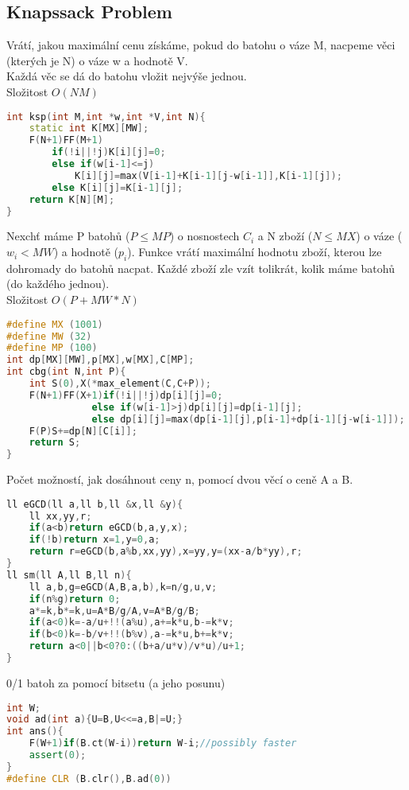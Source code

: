 \documentclass[11pt]{article}
\begin{document}
\subsection{Knapssack Problem}
Vrátí, jakou maximální cenu získáme, pokud do batohu o váze \textsf{M}, nacpeme věci (kterých je \textsf{N}) o váze \textsf{w} a hodnotě \textsf{V}.
\\Každá věc se dá do batohu vložit nejvýše jednou.
\\Složitost $O(NM)$
\begin{lstlisting}[language=C++]
int ksp(int M,int *w,int *V,int N){
    static int K[MX][MW];
    F(N+1)FF(M+1)
        if(!i||!j)K[i][j]=0;
        else if(w[i-1]<=j)
            K[i][j]=max(V[i-1]+K[i-1][j-w[i-1]],K[i-1][j]);
        else K[i][j]=K[i-1][j];
    return K[N][M];
}
\end{lstlisting}
Nexchť máme \textsf{P} batohů ($P\leq MP$) o nosnostech $C_i$ a \textsf{N} zboží ($N\leq MX$) o váze ($w_i<MW$) a hodnotě ($p_i$). Funkce vrátí maximální hodnotu zboží, kterou lze dohromady do batohů nacpat. Každé zboží zle vzít tolikrát, kolik máme batohů (do každého jednou).
\\Složitost $O(P+MW*N)$
\begin{lstlisting}[language=C++]
#define MX (1001)
#define MW (32)
#define MP (100)
int dp[MX][MW],p[MX],w[MX],C[MP];
int cbg(int N,int P){
    int S(0),X(*max_element(C,C+P));
    F(N+1)FF(X+1)if(!i||!j)dp[i][j]=0;
               else if(w[i-1]>j)dp[i][j]=dp[i-1][j];
               else dp[i][j]=max(dp[i-1][j],p[i-1]+dp[i-1][j-w[i-1]]);
    F(P)S+=dp[N][C[i]];
    return S;
}
\end{lstlisting}
Počet možností, jak dosáhnout ceny \textsf{n}, pomocí dvou věcí o ceně \textsf{A} a \textsf{B}.
\begin{lstlisting}[language=C++]
ll eGCD(ll a,ll b,ll &x,ll &y){
    ll xx,yy,r;
    if(a<b)return eGCD(b,a,y,x);
    if(!b)return x=1,y=0,a;
    return r=eGCD(b,a%b,xx,yy),x=yy,y=(xx-a/b*yy),r;
}
ll sm(ll A,ll B,ll n){
    ll a,b,g=eGCD(A,B,a,b),k=n/g,u,v;
    if(n%g)return 0;
    a*=k,b*=k,u=A*B/g/A,v=A*B/g/B;
    if(a<0)k=-a/u+!!(a%u),a+=k*u,b-=k*v;
    if(b<0)k=-b/v+!!(b%v),a-=k*u,b+=k*v;
    return a<0||b<0?0:((b+a/u*v)/v*u)/u+1;
}
\end{lstlisting}
0/1 batoh za pomocí bitsetu (a jeho posunu)
\begin{lstlisting}[language=C++]
int W;
void ad(int a){U=B,U<<=a,B|=U;}
int ans(){
    F(W+1)if(B.ct(W-i))return W-i;//possibly faster
    assert(0);
}
#define CLR (B.clr(),B.ad(0))
\end{lstlisting}
\end{document}
